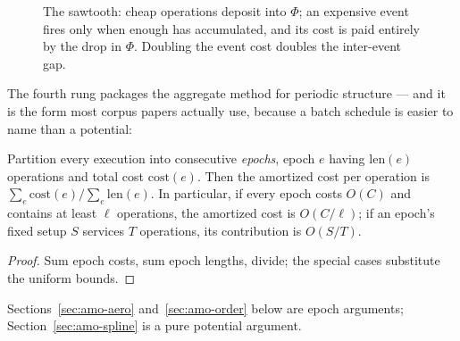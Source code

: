 \begin{figure}[ht]
\centering
{}
\caption{The sawtooth: cheap operations deposit into $\Phi$; an expensive
event fires only when enough has accumulated, and its cost is paid entirely
by the drop in $\Phi$. Doubling the event cost doubles the inter-event gap.}
\label{fig:amo-sawtooth}
\end{figure}

The fourth rung packages the aggregate method for periodic structure --- and
it is the form most corpus papers actually use, because a batch schedule is
easier to name than a potential:

\begin{proposition}\label{prop:amo-epoch}
Partition every execution into consecutive \emph{epochs}, epoch $e$ having
$\mathrm{len}(e)$ operations and total cost $\mathrm{cost}(e)$. Then the
amortized cost per operation is $\sum_e \mathrm{cost}(e) / \sum_e
\mathrm{len}(e)$. In particular, if every epoch costs $O(C)$ and contains at
least $\ell$ operations, the amortized cost is $O(C/\ell)$; if an epoch's
fixed setup $S$ services $T$ operations, its contribution is $O(S/T)$. \eop
\end{proposition}

\begin{proof}
Sum epoch costs, sum epoch lengths, divide; the special cases substitute the uniform bounds.
\end{proof}

Sections~\ref{sec:amo-aero} and~\ref{sec:amo-order} below are epoch
arguments; Section~\ref{sec:amo-spline} is a pure potential argument.

